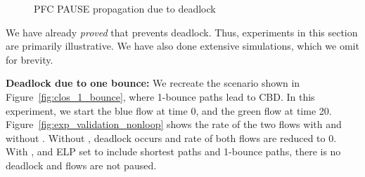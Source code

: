 \begin{figure}[t]
	\centering
	


	\caption{PFC PAUSE propagation due to deadlock
	 }\label{fig:exp_validation_propagation}
\end{figure}


We have already {\em proved} that \sysname{} prevents deadlock. Thus,
experiments in this section are primarily illustrative. We have also done
extensive simulations, which we omit for brevity.

\textbf{Deadlock due to one bounce:} We recreate the scenario shown in
Figure~\ref{fig:clos_1_bounce}, where 1-bounce paths lead to CBD.  In this
experiment, we start the blue flow at time 0, and the green flow at time 20.
Figure~\ref{fig:exp_validation_nonloop} shows the rate of the two flows with and
without \sysname{}.  Without \sysname{}, deadlock occurs and rate of both flows
are reduced to 0. With \sysname{}, and ELP set to include shortest paths and
1-bounce paths, there is no deadlock and flows are not paused.

